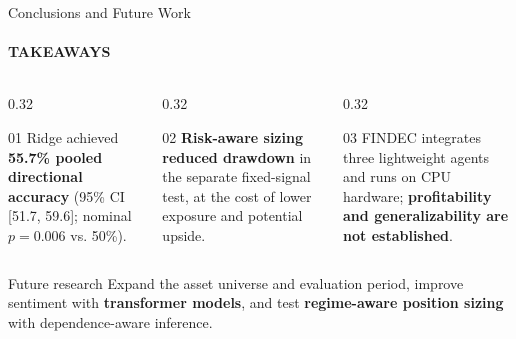 \documentclass[aspectratio=169,11pt]{beamer}
\newcommand{\keyphrase}[1]{\textbf{\color{DELCONred}#1}}
\begin{document}
\begin{frame}{Conclusions and Future Work}
  \framesubtitle{TAKEAWAYS}
  \begin{columns}[T,onlytextwidth]
    \begin{column}{0.32\textwidth}
      \begin{block}{\Large\color{DELCONgold}01}
        Ridge achieved \keyphrase{55.7\% pooled directional accuracy} (95\% CI [51.7, 59.6]; nominal $p=0.006$ vs. 50\%).
      \end{block}
    \end{column}
    \begin{column}{0.32\textwidth}
      \begin{block}{\Large\color{DELCONgold}02}
        \keyphrase{Risk-aware sizing reduced drawdown} in the separate fixed-signal test, at the cost of lower exposure and potential upside.
      \end{block}
    \end{column}
    \begin{column}{0.32\textwidth}
      \begin{block}{\Large\color{DELCONgold}03}
        FINDEC integrates three lightweight agents and runs on CPU hardware; \keyphrase{profitability and generalizability are not established}.
      \end{block}
    \end{column}
  \end{columns}
  \vspace{0.12cm}
  \begin{alertblock}{Future research}
    Expand the asset universe and evaluation period, improve sentiment with \keyphrase{transformer models}, and test \keyphrase{regime-aware position sizing} with dependence-aware inference.
  \end{alertblock}
\end{frame}
\end{document}
